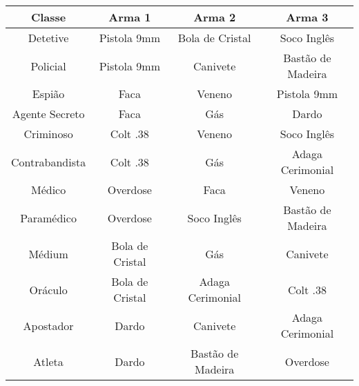 \documentclass[a4paper, 11pt]{article}
\begin{document}
\begin{center}
\begin{tabular}{ |c||c|c|c| }

\hline

Classe & Arma 1 & Arma 2 & Arma 3 \\

\hline
\hline

Detetive & Pistola 9mm & Bola de Cristal & Soco Inglês \\

\hline

Policial & Pistola 9mm & Canivete & Bastão de Madeira \\

\hline

Espião & Faca & Veneno & Pistola 9mm \\

\hline

Agente Secreto & Faca & Gás & Dardo \\

\hline

Criminoso & Colt .38 & Veneno & Soco Inglês \\

\hline

Contrabandista & Colt .38 & Gás & Adaga Cerimonial \\

\hline

Médico & Overdose & Faca & Veneno \\

\hline

Paramédico & Overdose & Soco Inglês & Bastão de Madeira \\

\hline

Médium & Bola de Cristal & Gás & Canivete \\

\hline

Oráculo & Bola de Cristal & Adaga Cerimonial & Colt .38 \\

\hline

Apostador & Dardo & Canivete & Adaga Cerimonial \\

\hline

Atleta & Dardo & Bastão de Madeira & Overdose \\

\hline


\end{tabular}
\end{center}
\end{document}
